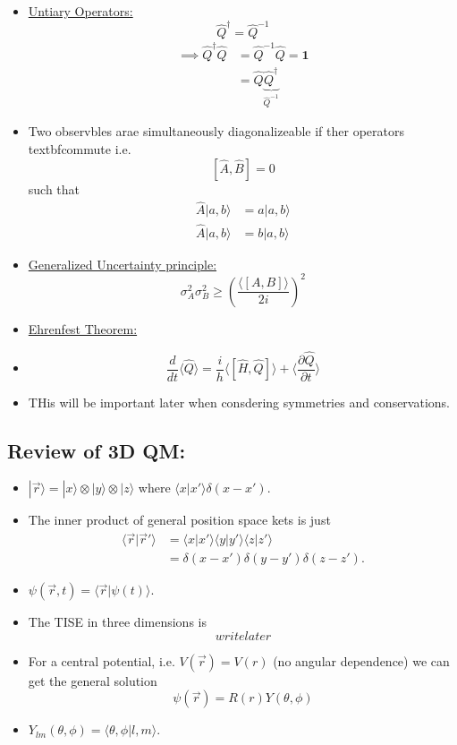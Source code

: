 \documentclass{article}
\newcommand{\ket}[1]{|#1 \rangle}
\newcommand{\inner}[2]{\langle #1 | #2 \rangle}
\newcommand{\mean}[1]{\langle #1 \rangle}
\begin{document}
\begin{itemize}
  \item \underline{Untiary Operators:} 
  \[ \hat{Q}^{\dagger} = \hat{Q}^{-1} \]
  \begin{align*}
    \implies \hat{Q}^{\dagger}\hat{Q} &= \hat{Q}^{-1}\hat{Q} = \mathbf{1}\\
                                      &= \hat{Q}\underbrace{\hat{Q}^{\dagger}}_{\hat{Q}^{-1}}
  \end{align*}

  \item Two observbles arae simultaneously diagonalizeable if ther operators textbf{commute} i.e. 
  \[ [\hat{A}, \hat{B}] = 0 \]
  such that 
  \begin{align*}
    \hat{A} \ket{a, b} &= a \ket{a,b } \\
    \hat{A} \ket{a, b} &= b \ket{a,b } 
  \end{align*}

  \item \underline{Generalized Uncertainty principle:} 
  \[ \sigma_A^2 \sigma_B^2 \geq \left( \frac{\mean{[A, B]}}{2i} \right)^2\]

  \item \underline{Ehrenfest Theorem:} 
  \item \[ \frac{d}{dt} \mean{\hat{Q}} = \frac{i}{h} \mean{[\hat{H}, \hat{Q}]} + \mean{\frac{\partial \hat{Q}}{\partial t}} \]
  \item THis will be important later when consdering symmetries and conservations.
\end{itemize}

\vskip 1cm
\subsection{Review of 3D QM:}

\begin{itemize}
  \item $\ket{\vec{r}} = \ket{x} \otimes \ket{y} \otimes \ket{z} $ where $\inner{x}{x'}  \delta(x - x')$.
  
  \item The inner product of general position space kets is just \begin{align*}
    \inner{\vec{r}}{\vec{r}'} &= \inner{x}{x'}\inner{y}{y'} \inner{z}{z'} \\
    &= \delta(x - x')\delta(y - y')\delta(z - z').
  \end{align*}

  \item $\psi(\vec{r}, t) = \inner{\vec{r}}{\psi(t)}$.
  \item The TISE in three dimensions is 
  \[ write later \]  

  \item For a central potential, i.e. $V(\vec{r}) = V(r)$ (no angular dependence) we can get the general solution
  \[ \psi(\vec{r}) = R(r) Y(\theta, \phi) \]

  \item $Y_{lm}(\theta, \phi) = \inner{\theta, \phi}{l, m}$.
\end{itemize}
\end{document}
